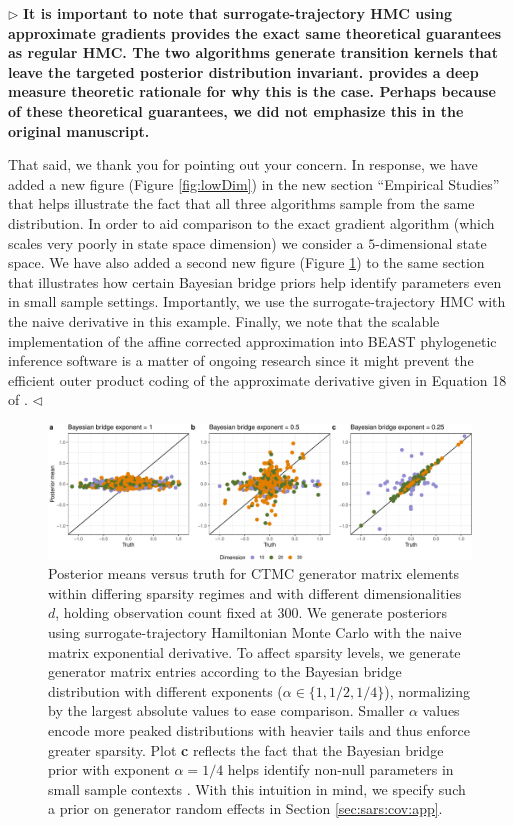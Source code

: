 \documentclass[12pt]{article}
\newenvironment{reply}{$\triangleright$\bfseries}{$\triangleleft$}
\begin{document}
\begin{reply}
  It is important to note that surrogate-trajectory HMC using approximate gradients provides the exact same theoretical guarantees as regular HMC.  The two algorithms generate transition kernels that leave the targeted posterior distribution invariant.  \cite{glatt2020accept} provides a deep measure theoretic rationale for why this is the case.  Perhaps because of these theoretical guarantees, we did not emphasize this in the original manuscript.
  
  That said, we thank you for pointing out your concern.  In response, we have added a new figure (Figure \ref{fig:lowDim}) in the new section ``Empirical Studies'' that helps illustrate the fact that all three algorithms sample from the same distribution.  In order to aid comparison to the exact gradient algorithm (which scales very poorly in state space dimension) we consider a $5$-dimensional state space.  We have also added a second new figure (Figure \ref{fig:truthMean}) to the same section that illustrates how certain Bayesian bridge priors help identify parameters even in small sample settings. Importantly, we use the surrogate-trajectory HMC with the naive derivative in this example.  Finally, we note that the scalable implementation of the affine corrected approximation into BEAST phylogenetic inference software is a matter of ongoing research since it might prevent the efficient outer product coding of the approximate derivative given in Equation 18 of \citet{magee2023random}.
\end{reply}

\begin{figure}[!t]
	\centering
	\includegraphics[width=\linewidth]{figures/truthMeanFig.pdf}
	\caption{Posterior means versus truth for CTMC generator matrix elements within differing sparsity regimes and with different dimensionalities $d$, holding observation count fixed at 300. We generate posteriors using surrogate-trajectory Hamiltonian Monte Carlo with the naive matrix exponential derivative.  To affect sparsity levels, we generate generator matrix entries according to the Bayesian bridge distribution \citep{polson2014bayesian} with different exponents ($\alpha \in \{1,1/2,1/4\}$), normalizing by the largest absolute values to ease comparison. Smaller $\alpha$ values encode more peaked distributions with heavier tails and thus enforce greater sparsity.   Plot \textbf{c} reflects the fact that the Bayesian bridge prior with exponent $\alpha=1/4$ helps identify non-null parameters in small sample contexts \citep{magee2023random}.  With this intuition in mind, we specify such a prior on generator random effects in Section \ref{sec:sars:cov:app}.}
	\label{fig:truthMean}
\end{figure}
\end{document}
